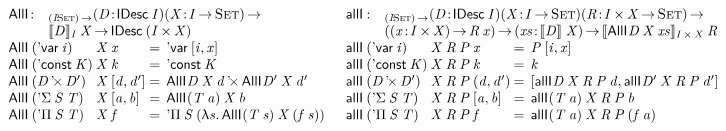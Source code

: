 \begin{figure*}

\[
\begin{array}{ll}
\stk{
\begin{array}{@{}ll}
\AllI{\!}{\!}{\!}{\!} : & _{\PI{\V{I}}{\Set}}
                          \PITEL{\V{D}}{\IDesc{\V{I}}}
                          \PI{\V{X}}{\V{I} \To \Set} \\
                        & \idescop{\V{D}}{\V{I}}{\V{X}} \To
                          \IDesc{(\TIMES{\V{I}}{\V{X}})}
\end{array} \\
\begin{array}{@{}l@{}l@{\:=\:\:}l}
\AllI{\:}{(\DVar{\V{i}})}{& \V{X}}{\V{x}} &
    \DVar{\pair{\V{i}}{\V{x}}{}} \\
\AllI{\:}{(\DConst{\V{K}})}{& \V{X}}{\V{k}} &
    \DConst{\V{K}} \\
\AllI{\:}{(\DProd{\V{D}}{\V{D'}})}{& \V{X}}{\pair{\V{d}}{\V{d'}}{}} &
    \DProd{\AllI{}{\V{D}}{\V{X}}{\V{d}}}{\AllI{}{\V{D'}}{\V{X}}{\V{d'}}} \\
\AllI{\:}{(\DSigma{\V{S}}{\V{T}})}{& \V{X}}{\pair{\V{a}}{\V{b}}{}} &
    \AllI{}{(\V{T}\: \V{a})}{\V{X}}{\V{b}} \\
\AllI{\:}{(\DPi{\V{S}}{\V{T}})}{& \V{X}}{\V{f}} &
    \DPi{\V{S}}{(\LAM{\V{s}} \AllI{}{(\V{T}\: \V{s})}{\V{X}}{(\V{f}\: \V{s})})}
\end{array}
}
&
\stk{
\begin{array}{@{}ll}
\allI{\!}{\!}{\!}{\!}{\!}{\!} : & _{\PI{\V{I}}{\Set}}
                                  \PITEL{\V{D}}{\IDesc{\V{I}}}
                                  \PITEL{\V{X}}{\V{I} \To \Set} 
                                  \PI{\V{R}}{\TIMES{\V{I}}{\V{X}} \To \Set} \\
                                & (\PI{\V{x}}{\TIMES{\V{I}}{\V{X}}} \V{R}\: \V{x}) \To
                                  \PI{\V{xs}}{\idescop{\V{D}}{}{\V{X}}} 
                                  \idescop{\AllI{}{\V{D}}{\V{X}}{\V{xs}}}{\TIMES{\V{I}}{\V{X}}}{\V{R}}
\end{array} \\
\begin{array}{@{}l@{}l@{\:=\:\:}l}
\allI{\:}{(\DVar{\V{i}})}{& \V{X}}{\V{R}}{\V{P}}{\V{x}} &
    \V{P}\: \pair{\V{i}}{\V{x}}{} \\
\allI{\:}{(\DConst{\V{K}})}{& \V{X}}{\V{R}}{\V{P}}{\V{k}} &
    \V{k} \\
\allI{\:}{(\DProd{\V{D}}{\V{D'}})}{& \V{X}}{\V{R}}{\V{P}}{(\V{d}, \V{d'})} &
    \pair{\allI{}{\V{D}}{\V{X}}{\V{R}}{\V{P}}{\V{d}}}
         {\allI{}{\V{D'}}{\V{X}}{\V{R}}{\V{P}}{\V{d'}}}{} \\
\allI{\:}{(\DSigma{\V{S}}{\V{T}})}{& \V{X}}{\V{R}}{\V{P}}{\pair{\V{a}}{\V{b}}{}} &
    \allI{}{(\V{T}\: \V{a})}{\V{X}}{\V{R}}{\V{P}}{\V{b}} \\
\allI{\:}{(\DPi{\V{S}}{\V{T}})}{& \V{X}}{\V{R}}{\V{P}}{\V{f}} &
    \allI{}{(\V{T}\: \V{a})}{\V{X}}{\V{R}}{\V{P}}{(\V{f}\: \V{a})}
\end{array}
\end{array}
}
\]


\end{figure*}
